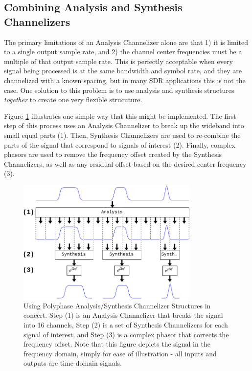 \documentclass[12pt]{report}
\begin{document}
\subsection{Combining Analysis and Synthesis Channelizers}
\label{sec:combine_analysis_synthesis}
The primary limitations of an Analysis Channelizer alone are that 1) it is limited
to a single output sample rate, and 2) the channel center frequencies must be
a multiple of that output sample rate. This is perfectly acceptable when every
signal being processed is at the same bandwidth and symbol rate, and they are
channelized with a known spacing, but in many SDR applications this is not the
case. One solution to this problem is to use analysis and synthesis structures
\emph{together} to create one very flexible strucuture.

Figure \ref{fig:analysis_and_synthesis} illustrates one simple way that this
might be implemented. The first step of this process uses an Analysis
Channelizer to break up the wideband into small equal parts (1). Then,
Synthesis Channelizers are used to re-combine the parts of the signal that
correspond to signals of interest (2). Finally, complex phasors are used to
remove the frequency offset created by the Synthesis Channelizers, as well as
any residual offset based on the desired center frequency (3).

\begin{figure}[h!]
    \begin{center}
    \includegraphics[width=0.8\textwidth]{polyphase}%
    \end{center}
    \caption{
Using Polyphase Analysis/Synthesis Channelizer Structures in concert. Step (1)
is an Analysis Channelizer that breaks the signal into 16 channels, Step (2) is
a set of Synthesis Channelizers for each signal of interest, and Step (3) is
a complex phasor that corrects the frequency offset. Note that this figure
depicts the signal in the frequency domain, simply for ease of illustration -
all inputs and outputs are time-domain signals.
    }
    \label{fig:analysis_and_synthesis}
\end{figure}
\end{document}
